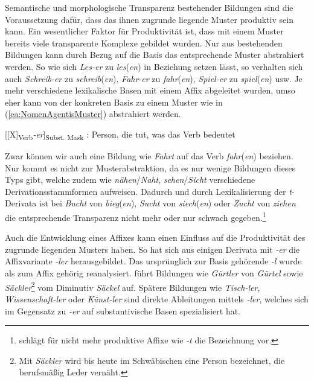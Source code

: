 Semantische und morphologische Transparenz bestehender Bildungen sind die Voraussetzung dafür, dass das ihnen zugrunde liegende Muster produktiv sein kann. Ein wesentlicher Faktor für Produktivität ist, dass mit einem Muster bereits viele transparente Komplexe gebildet wurden. Nur aus bestehenden Bildungen kann durch Bezug auf die Basis das entsprechende Muster abstrahiert werden. So wie sich \textit{Les-er} zu \textit{les}(\textit{en}) in Beziehung setzen lässt, so verhalten sich auch \textit{Schreib-er} zu \textit{schreib}(\textit{en}), \textit{Fahr-er} zu \textit{fahr}(\textit{en}), \textit{Spiel-er} zu \textit{spiel}(\textit{en}) usw. Je mehr verschiedene lexikalische Basen mit einem Affix abgeleitet wurden, umso eher kann von der konkreten Basis zu einem Muster wie in (\ref{ea:NomenAgentisMuster}) abstrahiert werden.     

\ea \label{ea:NomenAgentisMuster} [[X]\textsubscript{Verb}\textit{-er}]\textsubscript{Subst. Mask} : Person, die tut, was das Verb bedeutet
\z 

Zwar können wir auch eine Bildung wie \textit{Fahrt} auf das Verb \textit{fahr}(\textit{en}) beziehen. Nur kommt es nicht zur Musterabstraktion, da es nur wenige Bildungen dieses Typs gibt, welche zudem wie \textit{nähen}/\textit{Naht}, \textit{sehen}/\textit{Sicht} verschiedene Derivationsstammformen aufweisen. Dadurch und durch Lexikalisierung der \textit{t}-Derivata ist \zB bei \textit{Bucht} von \textit{bieg}(\textit{en}), \textit{Sucht} von \textit{siech}(\textit{en}) oder \textit{Zucht} von \textit{ziehen} die entsprechende Transparenz nicht mehr oder nur schwach gegeben.\footnote{\citet[228]{Eisenberg2020_Wort} schlägt für nicht mehr produktive Affixe wie \textit{-t} die Bezeichnung  vor.}

Auch die Entwicklung eines Affixes kann einen Einfluss auf die Produktivität des zugrunde liegenden Musters haben. So hat sich aus einigen Derivata mit \textit{-er} die Affixvariante \textit{-ler} herausgebildet. Das ursprünglich zur Basis gehörende \textit{-l} wurde als zum Affix gehörig reanalysiert. \citet[292--293]{Wilmanns1896Wb} führt Bildungen wie \textit{Gürtler} von \textit{Gürtel} sowie \textit{Säckler}\footnote{Mit \textit{Säckler} wird bis heute im Schwäbischen eine Person bezeichnet, die berufsmäßig Leder vernäht.} vom Diminutiv \textit{Säckel} auf. Spätere Bildungen wie \textit{Tisch-ler}, \textit{Wissenschaft-ler} oder \textit{Künst-ler} sind direkte Ableitungen mittels \textit{-ler}, welches sich im Gegensatz zu \textit{-er} auf substantivische Basen spezialisiert hat.


